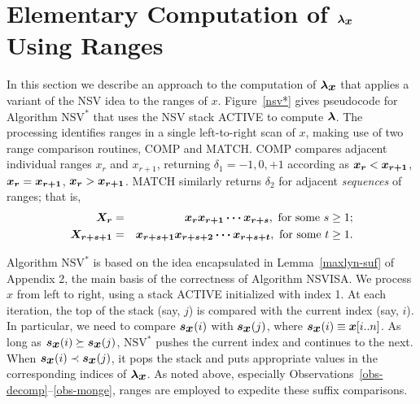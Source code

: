 \documentclass[10pt]{llncs}
\def\s#1{\mbox{\boldmath $#1$}}
\def\NSV{\mbox{NSV}}
\begin{document}
\section{Elementary Computation of $\s{\lambda}_{\s{x}}$ Using Ranges}
\label{sect-newalgs}

In this section we describe an approach to the computation of $\s{\lambda}_{\s{x}}$
that applies a variant of the NSV idea to the ranges of \s{x}.
Figure~\ref{nsv*} gives pseudocode for Algorithm $\NSV^*$
that uses the NSV stack ACTIVE to compute $\s{\lambda}$.
The processing identifies ranges in a single left-to-right scan
of \s{x}, making use of two range comparison routines, COMP and MATCH.
COMP compares adjacent individual ranges \s{x_r} and \s{x_{r+1}}, returning $\delta_1 = -1,0,+1$
according as $\s{x_r} < \s{x_{r+1}}$, $\s{x_r} = \s{x_{r+1}}$, $\s{x_r} > \s{x_{r+1}}$.
MATCH similarly returns $\delta_2$ for adjacent {\it sequences} of ranges; that is,
\begin{eqnarray*}
\s{X_r} &=& \s{x_rx_{r+1}\cdots x_{r+s}}, \mbox{ for some } s \ge 1; \\ 
\s{X_{r+s+1}} &=& \s{x_{r+s+1}x_{r+s+2}\cdots x_{r+s+t}}, \mbox{ for some } t \ge 1.
\end{eqnarray*}



Algorithm $\NSV^*$ is based on the idea encapsulated in Lemma~\ref{maxlyn-suf}
of Appendix 2,
the main basis of the correctness of Algorithm NSVISA.
We process \s{x} from left to right, using a stack ACTIVE initialized with index 1.
At each iteration, the top of the stack (say, $j$)
is compared with the current index (say, $i$).
In particular, we need to compare $\s{s}_{\s{x}}(i)$ with $\s{s}_{\s{x}}(j)$,
where $\s{s}_{\s{x}}(i) \equiv \s{x}[i..n]$.
As long as $\s{s}_{\s{x}}(i) \succeq \s{s}_{\s{x}}(j)$,
$\NSV^*$ pushes the current index and continues to the next.
When $\s{s}_{\s{x}}(i) \prec \s{s}_{\s{x}}(j)$,
it pops the stack and puts
appropriate values in the corresponding indices of $\s{\lambda}_{\s{x}}$.
As noted above, especially Observations~\ref{obs-decomp}--\ref{obs-monge},
ranges are employed to expedite these suffix comparisons.
\end{document}
